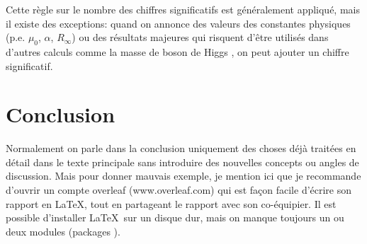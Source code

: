 \documentclass[french,11pt]{article}
\begin{document}
Cette règle sur le nombre des chiffres significatifs est généralement appliqué, mais il existe des exceptions: quand on annonce des valeurs des constantes physiques (p.e. $\mu_0$, $\alpha$, $R_\infty$) ou des résultats majeures qui risquent d'être utilisés dans d'autres calculs comme la masse de boson de Higgs \cite{aad2015combined}, on peut ajouter un chiffre significatif.

\section*{Conclusion}
Normalement on parle dans la conclusion uniquement des choses déjà traitées en détail dans le texte principale sans introduire des nouvelles concepts ou angles de discussion. Mais pour donner mauvais exemple, je mention ici que je recommande d'ouvrir un compte overleaf (www.overleaf.com) qui est façon facile d'écrire son rapport en \LaTeX, tout en partageant le rapport avec son co-équipier. Il est possible d'installer \LaTeX \ sur un disque dur, mais on manque toujours un ou deux modules (\og packages \fg{}).


\end{document}
